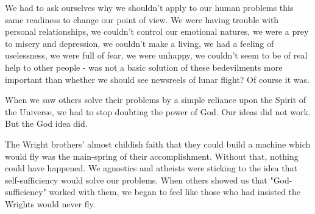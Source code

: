 \begin{biblechapter}
    We had to ask ourselves why we shouldn't apply to our human problems this same readiness to change our point of view. 
We were having trouble with personal relationships, 
we couldn't control our emotional natures, 
we were a prey to misery and depression, 
we couldn't make a living, 
we had a feeling of uselessness, 
we were full of fear, 
we were unhappy, 
we couldn't seem to be of real help to other people 
- was not a basic solution of these bedevilments more important than whether we should see newsreels of lunar flight? 
Of course it was.

When we saw others solve their problems by a simple reliance upon the Spirit of the Universe, 
we had to stop doubting the power of God. 
Our ideas did not work. 
But the God idea did.

The Wright brothers' almost childish faith that they could build a machine which would fly 
was the main-spring of their accomplishment. 
Without that, nothing could have happened. 
We agnostics and atheists were sticking to the idea that self-sufficiency would solve our problems. 
When others showed us that "God-sufficiency" worked with them, 
we began to feel like those who had insisted the Wrights would never fly.
\end{biblechapter}


